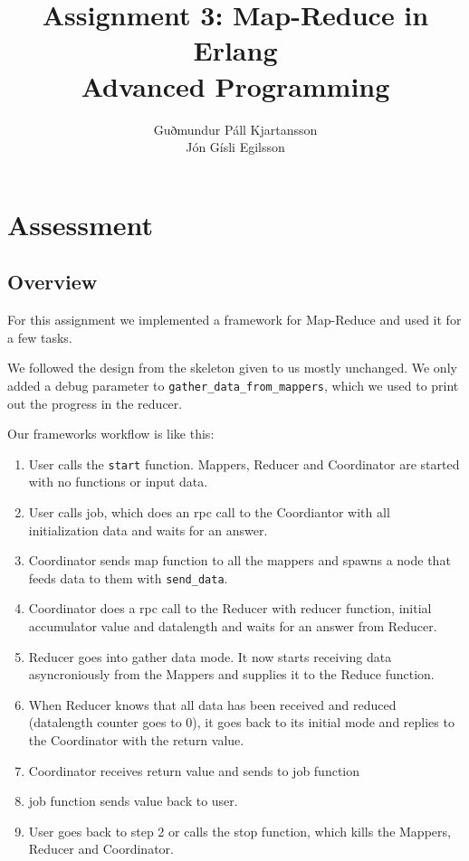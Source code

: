 \documentclass[a4paper,10pt]{article}
\title{
	Assignment 3: Map-Reduce in Erlang\\
	Advanced Programming
  }
\author{
	Guðmundur Páll Kjartansson\\
	Jón Gísli Egilsson	
}
\begin{document}
\maketitle

\section{Assessment}

\subsection{Overview}
For this assignment we implemented a framework for Map-Reduce and used it for a few tasks.

We followed the design from the skeleton given to us mostly unchanged. We only added a debug parameter to \verb!gather_data_from_mappers!, which we used to print out the progress in the reducer.

Our frameworks workflow is like this:

\begin{enumerate}
\item User calls the \verb!start! function. Mappers, Reducer and Coordinator are started with no functions or input data.
\item User calls job, which does an rpc call to the Coordiantor with all initialization data and waits for an answer. 
\item Coordinator sends map function to all the mappers and spawns a node that feeds data to them with \verb!send_data!.
\item Coordinator does a rpc call to the Reducer with reducer function, initial accumulator value and datalength and waits for an answer from Reducer.
\item Reducer goes into gather data mode. It now starts receiving data asyncroniously from the Mappers and supplies it to the Reduce function.
\item When Reducer knows that all data has been received and reduced (datalength counter goes to 0), it goes back to its initial mode and replies to the Coordinator with the return value.
\item Coordinator receives return value and sends to job function
\item job function sends value back to user.
\item User goes back to step 2 or calls the stop function, which kills the Mappers, Reducer and Coordinator.
\end{enumerate}
\end{document}
